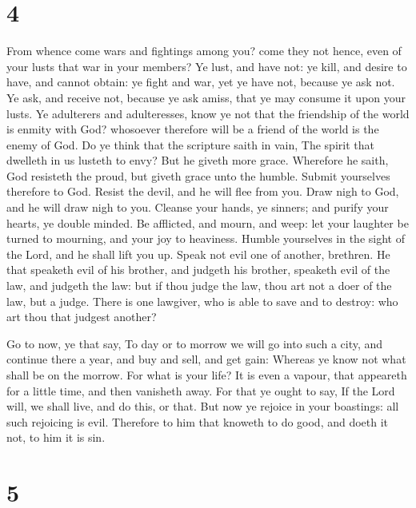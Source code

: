 \hypertarget{section-3}{%
\section{4}\label{section-3}}

 From whence come wars and fightings among you? come they
not hence, even of your lusts that war in your members? 
Ye lust, and have not: ye kill, and desire to have, and cannot obtain:
ye fight and war, yet ye have not, because ye ask not.  Ye
ask, and receive not, because ye ask amiss, that ye may consume it upon
your lusts.  Ye adulterers and adulteresses, know ye not
that the friendship of the world is enmity with God? whosoever therefore
will be a friend of the world is the enemy of God.  Do ye
think that the scripture saith in vain, The spirit that dwelleth in us
lusteth to envy?  But he giveth more grace. Wherefore he
saith, God resisteth the proud, but giveth grace unto the humble.
 Submit yourselves therefore to God. Resist the devil, and
he will flee from you.  Draw nigh to God, and he will draw
nigh to you. Cleanse your hands, ye sinners; and purify your hearts, ye
double minded.  Be afflicted, and mourn, and weep: let
your laughter be turned to mourning, and your joy to heaviness.
 Humble yourselves in the sight of the Lord, and he shall
lift you up.  Speak not evil one of another, brethren. He
that speaketh evil of his brother, and judgeth his brother, speaketh
evil of the law, and judgeth the law: but if thou judge the law, thou
art not a doer of the law, but a judge.  There is one
lawgiver, who is able to save and to destroy: who art thou that judgest
another?

 Go to now, ye that say, To day or to morrow we will go
into such a city, and continue there a year, and buy and sell, and get
gain:  Whereas ye know not what shall be on the morrow.
For what is your life? It is even a vapour, that appeareth for a little
time, and then vanisheth away.  For that ye ought to say,
If the Lord will, we shall live, and do this, or that. 
But now ye rejoice in your boastings: all such rejoicing is evil.
 Therefore to him that knoweth to do good, and doeth it
not, to him it is sin.

\hypertarget{section-4}{%
\section{5}\label{section-4}}

